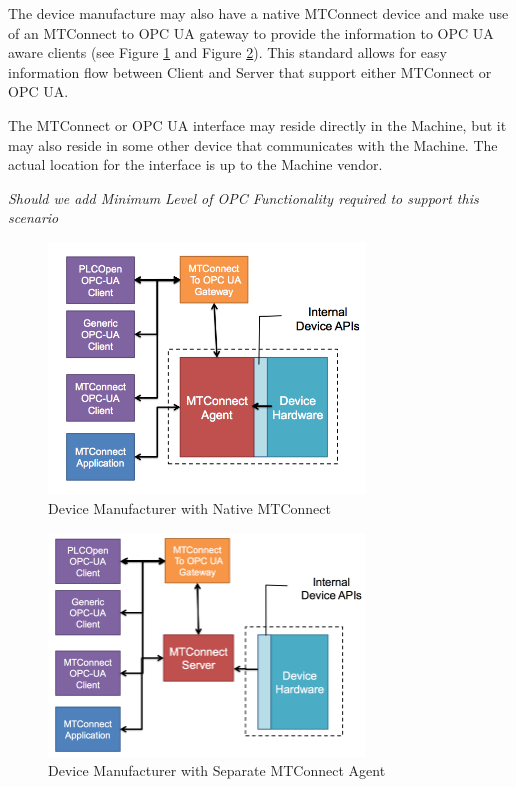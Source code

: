 The device manufacture may also have a native MTConnect device and make use of an MTConnect to OPC UA gateway to provide the information to OPC UA aware clients (see Figure \ref{fig:device_mfg_native} and Figure \ref{fig:device_mfg_separate}). This standard allows for easy information flow between Client and Server that support either MTConnect or OPC UA.

The MTConnect or OPC UA interface may reside directly in the Machine, but it may also reside in some other device that communicates with the Machine. The actual location for the interface is up to the Machine vendor.

\textit{Should we add Minimum Level of OPC Functionality required to support this scenario}

\begin{figure}[h]
  \centering
  \includegraphics[width=0.75\textwidth]{diagrams/DeviceManufacturerNativeMTConnect.png}
  \caption{Device Manufacturer with Native MTConnect}
  \label{fig:device_mfg_native}
\end{figure}

\begin{figure}[h]
  \centering
  \includegraphics[width=0.75\textwidth]{diagrams/DeviceManufacturerSeparateAgent.png}
  \caption{Device Manufacturer with Separate MTConnect Agent}
  \label{fig:device_mfg_separate}
\end{figure}

